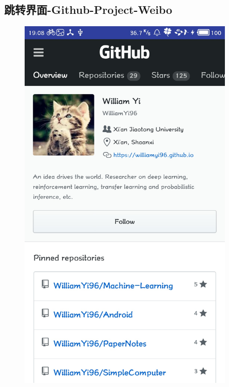 \documentclass[UTF8, Microsoft YaHei]{book}
\begin{document}
    \subsection{跳转界面-Github-Project-Weibo}
    \begin{figure}[!htb]
    \centering
    \begin{minipage}[c]{0.33\textwidth}
    \centering
    \includegraphics[width=0.92\textwidth]{img/github.png}
    \end{minipage}%
    \begin{minipage}[c]{0.33\textwidth}
    \centering

\end{minipage}
\end{figure}
\end{document}
